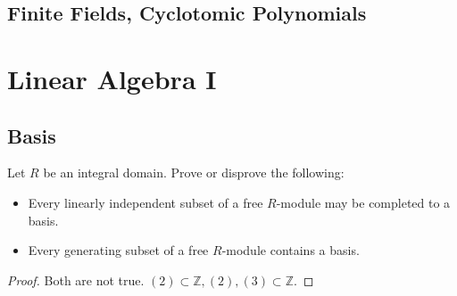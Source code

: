 \documentclass[openany]{book}
\newcommand{\Z}{\mathbb{Z}}
\begin{document}









\section{Finite Fields, Cyclotomic Polynomials}

















\chapter{Linear Algebra I}

\section{Basis}
\begin{prob}[1.5]
    Let \( R \) be an integral domain. Prove or disprove the following:
\begin{itemize}
    \item Every linearly independent subset of a free \( R \)-module may be completed to a basis.
    \item Every generating subset of a free \( R \)-module contains a basis.
\end{itemize}
\end{prob}
\begin{proof}
    Both are not true. $(2)\subset\Z, (2),(3)\subset\Z$.
\end{proof}
\end{document}

